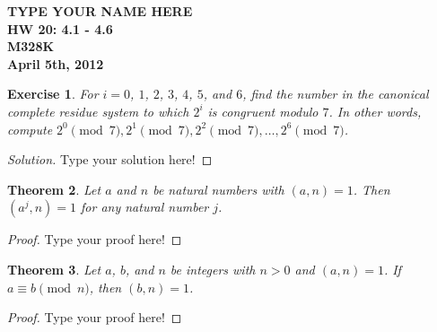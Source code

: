 \documentclass[12pt,leqno]{article}
\numberwithin{equation}{section}
\newtheorem{thm}{Theorem}[section]
\newtheorem{exer}[thm]{Exercise}
\theoremstyle{definition}
\begin{document}
\thispagestyle{plain}
\begin{flushright}
\large{\textbf{TYPE YOUR NAME HERE \\
HW 20: 4.1 - 4.6\\
M328K \\
April 5th, 2012 \\}}
\end{flushright}

\markboth{}{} \setcounter{section}{0} \baselineskip=18pt

\setcounter{tocdepth}{4}



\setcounter{section}{4}

\setcounter{thm}{0}

\begin{exer}For $i = 0$, $1$, $2$, $3$, $4$, $5$, and $6$,
find the number in the canonical complete residue
system to which
$2^i$ is congruent modulo $7$.  In other words, compute
$2^0\pmod{7}, 2^1\pmod{7}, 2^2\pmod{7}, \dots, 2^6\pmod{7}$.
\end{exer}
\begin{proof}[Solution]
Type your solution here!
\end{proof}


\begin{thm}
Let $a$ and $n$ be natural numbers with $(a, n) = 1$.  Then $(a^j,
n) = 1$ for any natural number $j$.
\end{thm}
\begin{proof}[Proof]
Type your proof here!
\end{proof}


\begin{thm}
Let $a$, $b$, and $n$ be integers with $n>0$ and $(a, n) = 1$.  If
$a\equiv b \pmod{n}$, then $(b, n) = 1$.
\end{thm}
\begin{proof}[Proof]
Type your proof here!
\end{proof}
\end{document}
